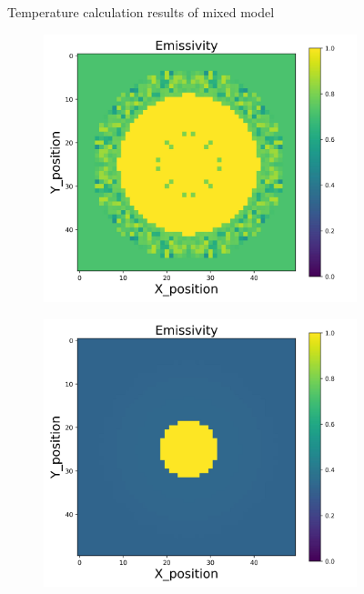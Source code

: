 {\begin{figure}[p]
\begin{minipage}{\textwidth}
\begin{subfigure}{0.325\textwidth}
        \end{subfigure}
    \end{minipage}
    \caption{Temperature calculation results of mixed model}
\end{figure}
\begin{figure}[p]
    \centering
    \begin{minipage}{\textwidth}
        \centering
        \begin{subfigure}{0.325\textwidth}
            \centering
            \includegraphics[width=\textwidth]{figures/raw_data/0/mix/emi_cal.jpg}
        \end{subfigure}
        \begin{subfigure}{0.325\textwidth}
            \centering
            \includegraphics[width=\textwidth]{figures/raw_data/5/mix/emi_cal.jpg}

\end{subfigure}
\end{minipage}
\end{figure}}
